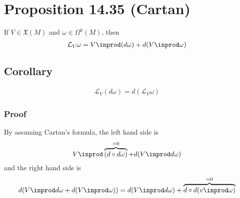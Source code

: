 \documentclass[11pt]{article}
\begin{document}
\section*{Proposition 14.35 (Cartan)}
\label{sec:org522fcd0}
If \(V\in\mathfrak{X}(M)\) and \(\omega\in\Omega^{k}(M)\), then\\
\begin{align*}
  \mathcal{L}_{V}\omega
  =V\inprod(d\omega)+d(V\inprod\omega)
\end{align*}
\subsection*{Corollary}
\label{sec:org5ded62a}
\begin{align*}
  \mathcal{L}_{V}(d\omega)=d(\mathcal{L}_{V}\omega)
\end{align*}
\subsubsection*{Proof}
\label{sec:orgb3915df}
By assuming Cartan's formula, the left hand side is\\
\begin{align*}
  V\inprod\overbrace{(d\circ d\omega)}^{=0}+d(V\inprod d\omega)
\end{align*}
and the right hand side is\\
\begin{align*}
  d(V\inprod d\omega+d(V\inprod\omega))
  =d(V\inprod d\omega)+\overbrace{d\circ d(v\inprod\omega)}^{=0}
\end{align*}
\end{document}
